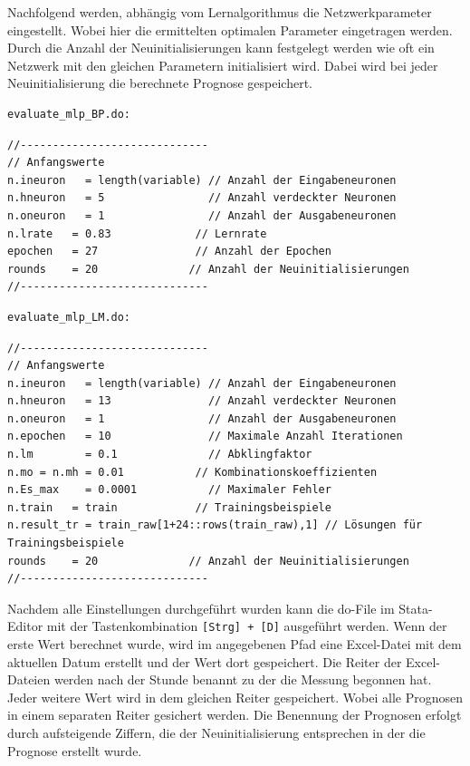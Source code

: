Nachfolgend werden, abhängig vom Lernalgorithmus die Netzwerkparameter eingestellt. Wobei hier die ermittelten optimalen Parameter eingetragen werden. Durch die Anzahl der Neuinitialisierungen kann festgelegt werden wie oft ein Netzwerk mit den gleichen Parametern initialisiert wird. Dabei wird bei jeder Neuinitialisierung die berechnete Prognose gespeichert.

\begin{Verbatim}
evaluate_mlp_BP.do:
\end{Verbatim}
{
\begin{lstlisting}[firstnumber=317]
//-----------------------------
// Anfangswerte
n.ineuron	= length(variable) // Anzahl der Eingabeneuronen
n.hneuron	= 5                // Anzahl verdeckter Neuronen
n.oneuron	= 1                // Anzahl der Ausgabeneuronen
n.lrate   = 0.83             // Lernrate
epochen   = 27               // Anzahl der Epochen
rounds    = 20			    // Anzahl der Neuinitialisierungen
//-----------------------------
\end{lstlisting}
}

\begin{Verbatim}
evaluate_mlp_LM.do:
\end{Verbatim}
{
\begin{lstlisting}[firstnumber=317]
//-----------------------------
// Anfangswerte
n.ineuron	= length(variable) // Anzahl der Eingabeneuronen
n.hneuron	= 13               // Anzahl verdeckter Neuronen
n.oneuron	= 1                // Anzahl der Ausgabeneuronen
n.epochen	= 10               // Maximale Anzahl Iterationen
n.lm		= 0.1              // Abklingfaktor
n.mo = n.mh = 0.01           // Kombinationskoeffizienten
n.Es_max	= 0.0001           // Maximaler Fehler
n.train   = train            // Trainingsbeispiele
n.result_tr = train_raw[1+24::rows(train_raw),1] // Lösungen für Trainingsbeispiele
rounds    = 20			    // Anzahl der Neuinitialisierungen
//-----------------------------
\end{lstlisting}
}

Nachdem alle Einstellungen durchgeführt wurden kann die do-File im Stata-Editor mit der Tastenkombination \verb|[Strg] + [D]| ausgeführt werden. Wenn der erste Wert berechnet wurde, wird im angegebenen Pfad eine Excel-Datei mit dem aktuellen Datum erstellt und der Wert dort gespeichert. Die Reiter der Excel-Dateien werden nach der Stunde benannt zu der die Messung begonnen hat. Jeder weitere Wert wird in dem gleichen Reiter gespeichert. Wobei alle Prognosen in einem separaten Reiter gesichert werden. Die Benennung der Prognosen erfolgt durch aufsteigende Ziffern, die der Neuinitialisierung entsprechen in der die Prognose erstellt wurde.